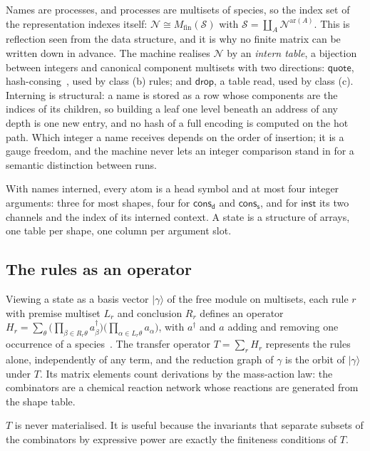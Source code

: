 \documentclass[acmsmall,screen,review,anonymous]{acmart}
\newcommand{\dd}{\mathsf{d}}
\newcommand{\sy}{\mathsf{s}}
\newcommand{\cons}{\mathsf{cons}}
\newcommand{\inst}{\mathsf{inst}}
\begin{document}
Names are processes, and processes are multisets of species, so the index set
of the representation indexes itself:
$\mathcal{N} \cong M_{\mathrm{fin}}(\mathcal{S})$ with
$\mathcal{S} = \coprod_{A} \mathcal{N}^{\mathrm{ar}(A)}$. This is reflection
seen from the data structure, and it is why no finite matrix can be written
down in advance. The machine realises $\mathcal{N}$ by an \emph{intern
table}, a bijection between integers and canonical component multisets with
two directions: $\mathsf{quote}$, hash-consing~\cite{FilliatreConchon06}, used
by class (b) rules; and $\mathsf{drop}$, a table read, used by class (c).
Interning is structural: a name is stored as a row whose components are the
indices of its children, so building a leaf one level beneath an address of
any depth is one new entry, and no hash of a full encoding is computed on the
hot path. Which integer a name receives depends on the order of insertion; it
is a gauge freedom, and the machine never lets an integer comparison stand in
for a semantic distinction between runs.

With names interned, every atom is a head symbol and at most four integer
arguments: three for most shapes, four for $\cons_{\dd}$ and $\cons_{\sy}$,
and for $\inst$ its two channels and the index of its interned context. A state is a structure of arrays, one table per shape, one column per
argument slot.

\subsection{The rules as an operator}
\label{sec:lattice}

Viewing a state as a basis vector $|\gamma\rangle$ of the free module on
multisets, each rule $r$ with premise multiset $L_{r}$ and conclusion $R_{r}$
defines an operator
$H_{r} = \sum_{\theta} \big(\prod_{\beta \in R_{r}\theta} a^{\dagger}_{\beta}\big)
\big(\prod_{\alpha \in L_{r}\theta} a_{\alpha}\big)$, with $a^{\dagger}$ and $a$
adding and removing one occurrence of a species~\cite{Doi76,BaezBiamonte18}.
The transfer operator $T = \sum_{r} H_{r}$ represents the rules alone,
independently of any term, and the reduction graph of $\gamma$ is the orbit of
$|\gamma\rangle$ under $T$. Its matrix elements count derivations by the
mass-action law: the combinators are a chemical reaction network whose
reactions are generated from the shape table.

$T$ is never materialised. It is useful because the invariants that separate
subsets of the combinators by expressive power are exactly the finiteness
conditions of $T$.
\end{document}
